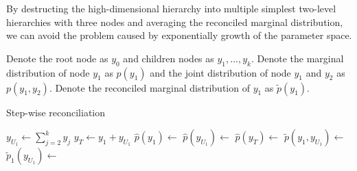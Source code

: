 \documentclass[a4paper,review,12pt,authoryear]{elsarticle}
\begin{document}
   By destructing the high-dimensional hierarchy into multiple simplest two-level hierarchies with three nodes and averaging the reconciled marginal distribution, we can avoid the problem caused by exponentially growth of the parameter space. 
  

   Denote the root node as $y_0$ and children nodes as $y_1, \dots, y_k$. 
   Denote the marginal distribution of node $y_1$ as $p(y_1)$ and the joint distribution of node $y_1$ and $y_2$ as $p(y_1, y_2)$. 
   Denote the reconciled marginal distribution of $y_1$ as $\tilde p(y_1)$.

   \begin{algorithm}[H]
    \caption{Step-wise reconciliation}
    $y_{U_1} \leftarrow \sum\limits_{j=2}^k y_j$\;
    $y_T \leftarrow y_1 + y_{U_1}$ \;
    $\hat p(y_1) \leftarrow$ \;
    $\hat p(y_{U_1}) \leftarrow$ \;
    $\hat p(y_{T}) \leftarrow$ \;
    $\tilde p(y_1, y_{U_1}) \leftarrow $ \;
    $\tilde p_1(y_{U_1}) \leftarrow$ \;
    
   \end{algorithm}
\end{document}
